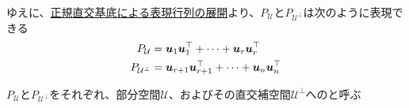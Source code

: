 \documentclass[../../../topic_linear-algebra]{subfiles}
\begin{document}
\br

ゆえに、\hyperref[thm:orthobasis-formula-for-rep-matrix]{正規直交基底による表現行列の展開}より、$P_{\mathcal{U}}$と$P_{\mathcal{U}^{\perp}}$は次のように表現できる
\begin{align*}
  P_{\mathcal{U}}         & = \vb*{u}_1 \vb*{u}_1^\top + \cdots + \vb*{u}_r \vb*{u}_r^\top         \\
  P_{\mathcal{U}^{\perp}} & = \vb*{u}_{r+1} \vb*{u}_{r+1}^\top + \cdots + \vb*{u}_n \vb*{u}_n^\top
\end{align*}

$P_{\mathcal{U}}$と$P_{\mathcal{U}^{\perp}}$をそれぞれ、部分空間$\mathcal{U}$、およびその直交補空間$\mathcal{U}^{\perp}$へのと呼ぶ
\end{document}
